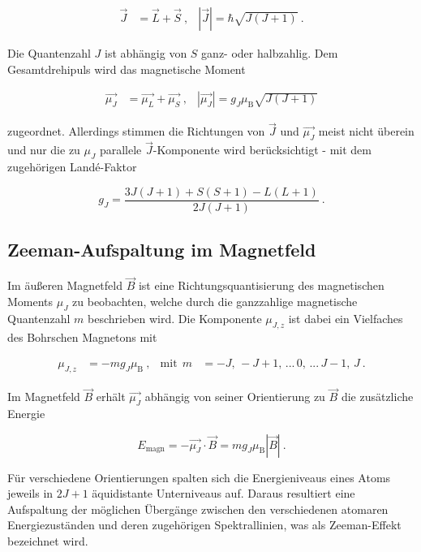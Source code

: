 \vspace{-15pt}
\begin{align}
    \vec{J} &= \vec{L} + \vec{S} \:, & |\vec{J}| = \hbar \sqrt{J(J+1)} \: .
\end{align}

Die Quantenzahl $J$ ist abhängig von $S$ ganz- oder halbzahlig.
Dem Gesamtdrehipuls wird das magnetische Moment

\vspace{-15pt}
\begin{align}
    \vec{\mu_J} &= \vec{\mu_L} + \vec{\mu_S} \:, & |\vec{\mu_J}| = g_J \mu_\text{B} \sqrt{J(J+1)}
\end{align}

zugeordnet. Allerdings stimmen die Richtungen von $\vec{J}$ und $\vec{\mu_J}$ meist nicht überein und
nur die zu $\mu_J$ parallele $\vec{J}$-Komponente wird berücksichtigt - mit dem zugehörigen Landé-Faktor 

\begin{equation}
    g_J = \frac{3J(J+1) + S(S+1) - L(L+1)}{2J(J+1)}\: .
\end{equation}

\subsection{Zeeman-Aufspaltung im Magnetfeld}

Im äußeren Magnetfeld $\vec{B}$ ist eine Richtungsquantisierung des magnetischen Moments
$\mu_J$ zu beobachten, welche durch die ganzzahlige magnetische Quantenzahl $m$ beschrieben wird.
Die Komponente $\mu_{J,z}$ ist dabei ein Vielfaches des Bohrschen Magnetons mit

\vspace{-15pt}
\begin{align}
    \mu_{J,z} &= - m g_J \mu_\text{B} \: , & \text{mit}\:\: m &= -J,\, -J+1,\, ...\, 0,\, ...\, J-1,\, J \: . 
\end{align}

Im Magnetfeld $\vec{B}$ erhält $\vec{\mu_J}$ abhängig von seiner Orientierung zu $\vec{B}$
die zusätzliche Energie

\begin{equation}
    E_\text{magn} = - \vec{\mu_J} \cdot \vec{B} = m g_J \mu_\text{B} |\vec{B}| \: .
\end{equation}

Für verschiedene Orientierungen spalten sich die Energieniveaus eines Atoms jeweils
in $2J+1$ äquidistante Unterniveaus auf. Daraus resultiert eine Aufspaltung
der möglichen Übergänge zwischen den verschiedenen atomaren Energiezuständen und deren 
zugehörigen Spektrallinien, was als Zeeman-Effekt bezeichnet wird.

